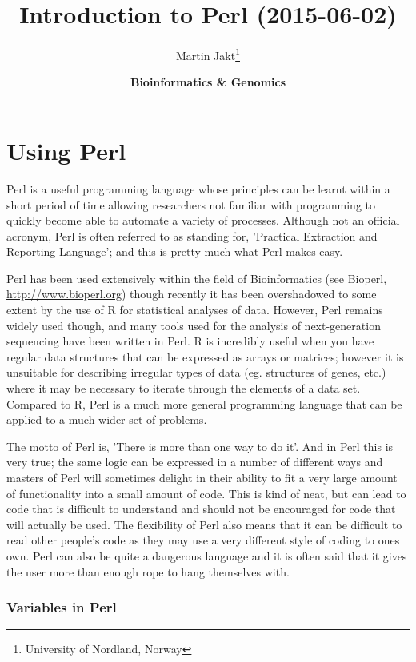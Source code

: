 \documentclass[11pt]{article}
\author{Martin Jakt\thanks{University of Nordland, Norway}}
\date{\textbf{Bioinformatics \& Genomics}}
\title{\textbf{Introduction to Perl} (2015-06-02)}
\begin{document}
\maketitle

\section{Using Perl}
\label{sec-5}

Perl is a useful programming language whose principles can be learnt
within a short period of time allowing researchers not familiar with
programming to quickly become able to automate a variety of processes.
Although not an official acronym, Perl is often referred to as standing
for, 'Practical Extraction and Reporting Language'; and this is pretty much
what Perl makes easy.

Perl has been used extensively within the field of Bioinformatics (see
Bioperl, \url{http://www.bioperl.org}) though recently it has been overshadowed to
some extent by the use of R for statistical analyses of data. However,
Perl remains widely used though, and many tools used for the analysis of next-generation sequencing
have been written in Perl. R is incredibly useful when you have
regular data structures that can be expressed as arrays or matrices;
however it is unsuitable for describing irregular types of data (eg.
structures of genes, etc.) where it may be necessary to iterate through
the elements of a data set. Compared to R, Perl is a much more general
programming language that can be applied to a much wider set of
problems.

The motto of Perl is, 'There is more than one way to do it'. And in Perl
this is very true; the same logic can be expressed in a number of
different ways and masters of Perl will sometimes delight in their
ability to fit a very large amount of functionality into a small amount
of code. This is kind of neat, but can lead to code that is difficult to
understand and should not be encouraged for code that will
actually be used. The flexibility of Perl also means that it can be
difficult to read other people's code as they may use a very different
style of coding to ones own. Perl can also be quite a dangerous language
and it is often said that it gives the user more than enough rope to
hang themselves with.

\subsubsection{Variables in Perl}
\label{sec-5-0-1}
\end{document}
